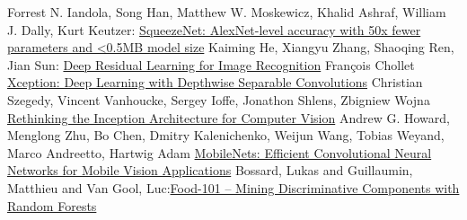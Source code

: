 \documentclass[12pt,a4paper]{scrartcl}
\numberwithin{equation}{section}
\begin{document}
\begin{thebibliography}{lem00}
  	Forrest N. Iandola, Song Han, Matthew W. Moskewicz, Khalid Ashraf, William J. Dally, Kurt Keutzer:
  	\href{https://arxiv.org/abs/1602.07360}{SqueezeNet: AlexNet-level accuracy with 50x fewer parameters and <0.5MB model size}
  		Kaiming He, Xiangyu Zhang, Shaoqing Ren, Jian Sun:
  		\href{https://arxiv.org/pdf/1512.03385.pdf}{Deep Residual Learning for Image Recognition}
  			François Chollet
  		\href{https://arxiv.org/abs/1610.02357}{Xception: Deep Learning with Depthwise Separable Convolutions}
 Christian Szegedy, Vincent Vanhoucke, Sergey Ioffe, Jonathon Shlens, Zbigniew Wojna
  			\href{https://arxiv.org/abs/1512.00567}{Rethinking the Inception Architecture for Computer Vision}
			Andrew G. Howard, Menglong Zhu, Bo Chen, Dmitry Kalenichenko, Weijun Wang, Tobias Weyand, Marco Andreetto, Hartwig Adam \href{https://arxiv.org/abs/1704.04861}{MobileNets: Efficient Convolutional Neural Networks for Mobile Vision Applications}
			Bossard, Lukas and Guillaumin, Matthieu and Van Gool, Luc:\href{https://www.vision.ee.ethz.ch/datasets_extra/food-101/}{Food-101 -- Mining Discriminative Components with Random Forests}
\end{thebibliography}

 
      

\newpage
  
 \thispagestyle{empty}


\vspace*{8cm}




\end{document}
